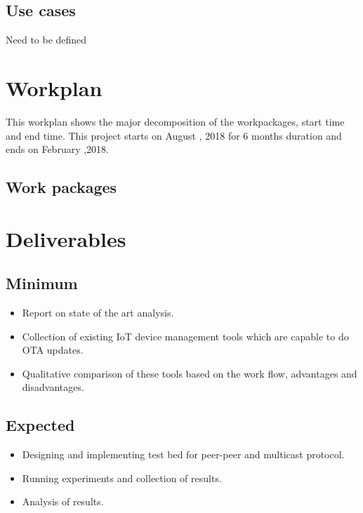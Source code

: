 \documentclass[12pt]{article}
\begin{document}
\subsection{Use cases}
Need to be defined

\section{Workplan}
This workplan shows the major decomposition of the workpackages, start time and end time. This project starts on August , 2018 for 6 months duration and ends on February ,2018.
\newpage
\subsection{Work packages}



\newpage
\section{Deliverables}
\subsection{Minimum}
\begin{itemize}
\item Report on state of the art analysis.
\item Collection of existing IoT device management tools which are capable to do OTA updates.
\item Qualitative comparison of these tools based on the work flow, advantages and disadvantages.
\end{itemize}
\subsection{Expected}
\begin{itemize}
\item Designing and implementing test bed for peer-peer and multicast protocol.
\item Running experiments and collection of results.
\item Analysis of results.
\end{itemize}
\end{document}
